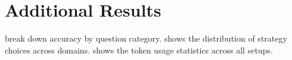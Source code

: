 \documentclass[11pt]{article}
\begin{document}
\newpage
\section{Additional Results}
\label{app:results}
 break down accuracy by question category.  shows the distribution of strategy choices across domains.  shows the token usage statistics across all setups. 


\end{document}
